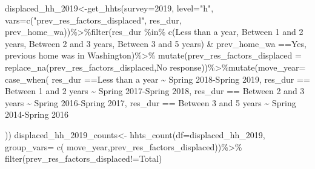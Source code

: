 \documentclass[
]{article}
\newenvironment{Shaded}{\begin{snugshade}}{\end{snugshade}}
\newcommand{\AttributeTok}[1]{\textcolor[rgb]{0.77,0.63,0.00}{#1}}
\newcommand{\FunctionTok}[1]{\textcolor[rgb]{0.00,0.00,0.00}{#1}}
\newcommand{\NormalTok}[1]{#1}
\newcommand{\OtherTok}[1]{\textcolor[rgb]{0.56,0.35,0.01}{#1}}
\newcommand{\SpecialCharTok}[1]{\textcolor[rgb]{0.00,0.00,0.00}{#1}}
\newcommand{\StringTok}[1]{\textcolor[rgb]{0.31,0.60,0.02}{#1}}
\begin{document}
\begin{Shaded}
\begin{Highlighting}[]
\NormalTok{displaced\_hh\_2019}\OtherTok{\textless{}{-}}\FunctionTok{get\_hhts}\NormalTok{(}\AttributeTok{survey=}\StringTok{\textquotesingle{}2019\textquotesingle{}}\NormalTok{, }\AttributeTok{level=}\StringTok{"h"}\NormalTok{, }\AttributeTok{vars=}\FunctionTok{c}\NormalTok{(}\StringTok{"prev\_res\_factors\_displaced"}\NormalTok{, }\StringTok{\textquotesingle{}res\_dur\textquotesingle{}}\NormalTok{, }\StringTok{\textquotesingle{}prev\_home\_wa\textquotesingle{}}\NormalTok{))}\SpecialCharTok{\%\textgreater{}\%}\FunctionTok{filter}\NormalTok{(res\_dur }\SpecialCharTok{\%in\%} \FunctionTok{c}\NormalTok{(}\StringTok{\textquotesingle{}Less than a year\textquotesingle{}}\NormalTok{, }\StringTok{\textquotesingle{}Between 1 and 2 years\textquotesingle{}}\NormalTok{, }\StringTok{\textquotesingle{}Between 2 and 3 years\textquotesingle{}}\NormalTok{,    }\StringTok{\textquotesingle{}Between 3 and 5 years\textquotesingle{}}\NormalTok{) }\SpecialCharTok{\&}\NormalTok{ prev\_home\_wa }\SpecialCharTok{==}\StringTok{\textquotesingle{}Yes, previous home was in Washington\textquotesingle{}}\NormalTok{)}\SpecialCharTok{\%\textgreater{}\%} \FunctionTok{mutate}\NormalTok{(}\AttributeTok{prev\_res\_factors\_displaced =} \FunctionTok{replace\_na}\NormalTok{(prev\_res\_factors\_displaced,}\StringTok{\textquotesingle{}No response\textquotesingle{}}\NormalTok{))}\SpecialCharTok{\%\textgreater{}\%}\FunctionTok{mutate}\NormalTok{(}\AttributeTok{move\_year=} \FunctionTok{case\_when}\NormalTok{(}
\NormalTok{  res\_dur }\SpecialCharTok{==}\StringTok{\textquotesingle{}Less than a year\textquotesingle{}} \SpecialCharTok{\textasciitilde{}} \StringTok{\textquotesingle{}Spring 2018{-}Spring 2019\textquotesingle{}}\NormalTok{,}
\NormalTok{  res\_dur }\SpecialCharTok{==} \StringTok{\textquotesingle{}Between 1 and 2 years\textquotesingle{}} \SpecialCharTok{\textasciitilde{}} \StringTok{\textquotesingle{}Spring 2017{-}Spring 2018\textquotesingle{}}\NormalTok{,}
\NormalTok{  res\_dur }\SpecialCharTok{==} \StringTok{\textquotesingle{}Between 2 and 3 years\textquotesingle{}} \SpecialCharTok{\textasciitilde{}} \StringTok{\textquotesingle{}Spring 2016{-}Spring 2017\textquotesingle{}}\NormalTok{,}
\NormalTok{  res\_dur }\SpecialCharTok{==} \StringTok{\textquotesingle{}Between 3 and 5 years\textquotesingle{}} \SpecialCharTok{\textasciitilde{}} \StringTok{\textquotesingle{}Spring 2014{-}Spring 2016\textquotesingle{}}
  
\NormalTok{))}
\NormalTok{displaced\_hh\_2019\_counts}\OtherTok{\textless{}{-}} \FunctionTok{hhts\_count}\NormalTok{(}\AttributeTok{df=}\NormalTok{displaced\_hh\_2019, }\AttributeTok{group\_vars=} \FunctionTok{c}\NormalTok{( }\StringTok{\textquotesingle{}move\_year\textquotesingle{}}\NormalTok{,}\StringTok{\textquotesingle{}prev\_res\_factors\_displaced\textquotesingle{}}\NormalTok{))}\SpecialCharTok{\%\textgreater{}\%}
\FunctionTok{filter}\NormalTok{(prev\_res\_factors\_displaced}\SpecialCharTok{!=}\StringTok{\textquotesingle{}Total\textquotesingle{}}\NormalTok{)}


\end{Highlighting}
\end{Shaded}
\end{document}
